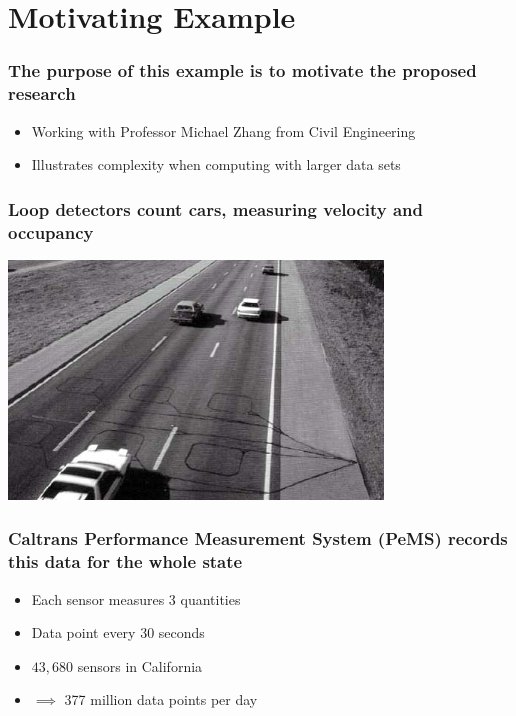 \documentclass{beamer}
\begin{document}
\section{Motivating Example}
\begin{frame}

    \frametitle{The purpose of this example is to motivate the proposed research}

    \begin{itemize}
        \item Working with Professor Michael Zhang from Civil Engineering
        \item Illustrates complexity when computing with larger data sets
    \end{itemize}

\end{frame}
\begin{frame}

    \frametitle{Loop detectors count cars, measuring velocity and
    occupancy}

\centerline{\includegraphics[height=2.5in]{loop_detector.jpg}}

\end{frame}
\begin{frame}

\frametitle{Caltrans Performance Measurement System (PeMS) records this
data for the whole state}

    \begin{itemize}
        \item Each sensor measures 3 quantities
        \item Data point every 30 seconds
        \item $43,680$ sensors in California
        \item $\implies$  377 million data points per day
    \end{itemize}

\end{frame}
\end{document}
